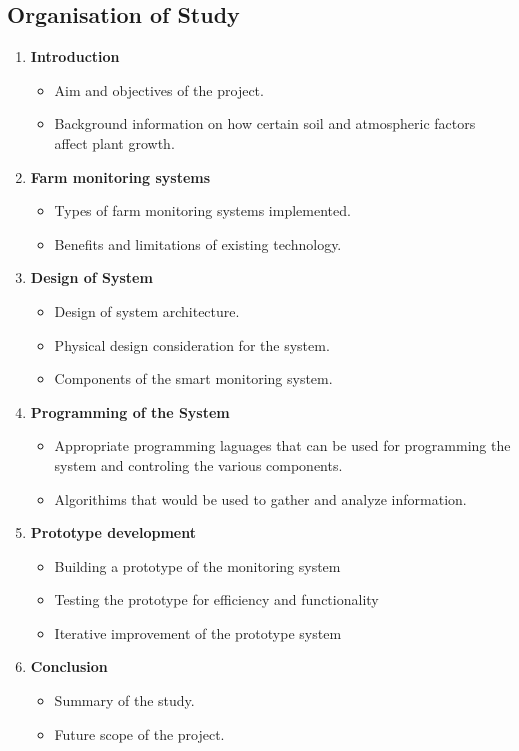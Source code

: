 \documentclass[12pt, a4paper]{article}
\begin{document}
\subsection{Organisation of Study}
\begin{enumerate}
\item \textbf{Introduction}
	\begin{itemize}
	\item[--] Aim and objectives of the project.
	\item[--] Background information on how certain soil and atmospheric factors affect plant growth.
	\end{itemize}
\item \textbf{Farm monitoring systems}
\begin{itemize}
    \item[--] Types of farm monitoring systems implemented.
	\item[--] Benefits and limitations of existing technology.
\end{itemize}
\item \textbf{Design of System}
\begin{itemize}
	\item[--] Design of system architecture.
    \item[--] Physical design consideration for the system.
    \item[--] Components of the smart monitoring system.
\end{itemize}
\item \textbf{Programming of the System}
\begin{itemize}
	\item[--] Appropriate programming laguages that can be used for programming the system and controling the various components.
	\item[--] Algorithims that would be used to gather and analyze information.
\end{itemize}
\item \textbf{Prototype development}
\begin{itemize}
\item[--] Building a prototype of the monitoring system
\item[--] Testing the prototype for efficiency and functionality
\item[--] Iterative improvement of the prototype system
\end{itemize}
\item \textbf{Conclusion}
\begin{itemize}
\item[--] Summary of the study.
\item[--] Future scope of the project.
\end{itemize}
\end{enumerate}
\newpage
\end{document}
